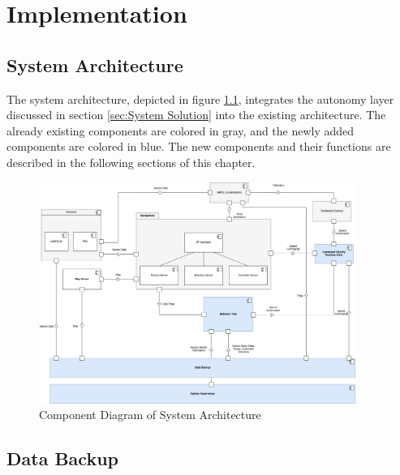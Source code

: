 \chapter{Implementation}
\label{cha:implementierung}

\section{System Architecture}

The system architecture, depicted in figure \ref{fig:component_diagram}, integrates the autonomy layer discussed in section \ref{sec:System Solution} into the existing architecture. The already existing components are colored in gray, and the newly added components are colored in blue. The new components and their functions are described in the following sections of this chapter. 


\begin{figure}[ht]
	\centering
	\includegraphics[width=0.92\textwidth]{images/component_diagram_bt.png}
	\caption{Component Diagram of System Architecture}
	\label{fig:component_diagram}
\end{figure}

\section{Data Backup}

